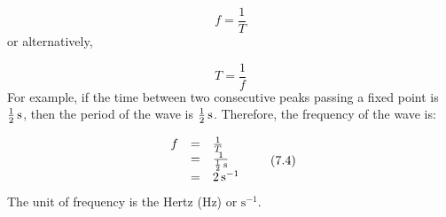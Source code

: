     \begin{equation}
    f=\frac{1}{T}\tag{7.2}
      \end{equation}
        \label{m38806*id319306}or alternatively,\par 
        \label{m38806*id319312}\nopagebreak\noindent{}
    \begin{equation}
    T=\frac{1}{f}\tag{7.3}
      \end{equation}
        \label{m38806*id319335}For example, if the time between two consecutive peaks passing a fixed point is $\frac{1}{2}\phantom{\rule{0.166667em}{0ex}}\mathrm{s}$, then the period of the wave is $\frac{1}{2}\phantom{\rule{0.166667em}{0ex}}\mathrm{s}$. Therefore, the frequency of the wave is:\par 
        \label{m38806*id319375}\nopagebreak\noindent{}
    \begin{equation}
    \begin{array}{ccc}\hfill f& =& \frac{1}{T}\hfill \\ & =& \frac{1}{\frac{1}{2}\phantom{\rule{0.166667em}{0ex}}\mathrm{s}}\hfill \\ & =& 2\phantom{\rule{0.166667em}{0ex}}{\mathrm{s}}^{-1}\hfill \end{array}\tag{7.4}
      \end{equation}
        \label{m38806*id319462}The unit of frequency is the Hertz ($\mathrm{Hz}$) or ${\mathrm{s}}^{-1}$.\par 
\label{m38806*secfhsst!!!underscore!!!id520}\vspace{.5cm} 
      \noindent

